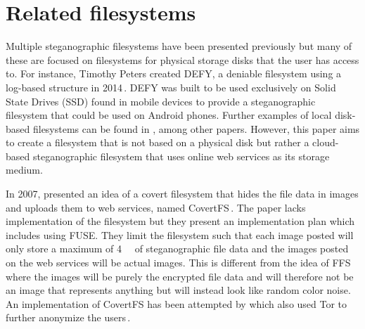 \section{Related filesystems}
\label{sec:rel_fs}
Multiple steganographic filesystems have been presented previously but many of these are focused on filesystems for physical storage disks that the user has access to. For instance, Timothy Peters created DEFY, a deniable filesystem using a log-based structure in 2014\,\cite{petersDEFYDeniableFile2014}. DEFY was built to be used exclusively on Solid State Drives (SSD) found in mobile devices to provide a steganographic filesystem that could be used on Android phones. Further examples of local disk-based filesystems can be found in \cite{andersonSteganographicFileSystem1998, mcdonaldStegFSSteganographicFile2000, domingo-ferrerSharedSteganographicFile2008, hanMultiuserSteganographicFile2010}, among other papers. However, this paper aims to create a filesystem that is not based on a physical disk but rather a cloud-based steganographic filesystem that uses online web services as its storage medium. 

In 2007, \citeauthor{baliga2007web} presented an idea of a covert filesystem that hides the file data in images and uploads them to web services, named CovertFS\,\cite{baliga2007web}. The paper lacks implementation of the filesystem but they present an implementation plan which includes using FUSE. They limit the filesystem such that each image posted will only store a maximum of \SI{4}{\kilo\byte} of steganographic file data and the images posted on the web services will be actual images. This is different from the idea of FFS where the images will be purely the encrypted file data and will therefore not be an image that represents anything but will instead look like random color noise. An implementation of CovertFS has been attempted by \citeauthor{sosaSuperSecretFile2007} which also used Tor to further anonymize the users\,\cite{sosaSuperSecretFile2007}.

